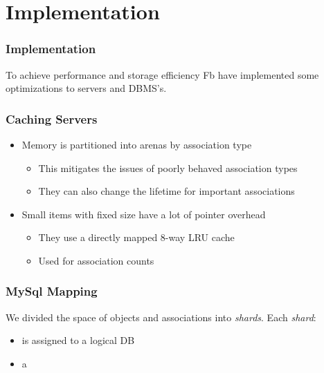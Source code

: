 \section{Implementation}
\begin{frame}
\frametitle{Implementation}
To achieve performance and storage efficiency Fb have implemented some optimizations to servers and DBMS's. 
\end{frame}

\begin{frame}[c]\frametitle{Caching Servers}
\begin{itemize}
	\item Memory is partitioned into arenas by association type
	\begin{itemize}
		\item This mitigates the issues of poorly behaved association types
		\item They can also change the lifetime for important associations
	\end{itemize}
	\item Small items with fixed size have a lot of pointer overhead
	\begin{itemize}
		\item They use a directly mapped 8-way LRU cache
		\item Used for association counts
	\end{itemize}
\end{itemize}    
\end{frame}

\begin{frame}[c]\frametitle{MySql Mapping}
    We divided the space of objects and associations into \emph{shards}. Each \emph{shard}:
    \begin{itemize}
    	\item is assigned to a logical DB
    	\item a
    \end{itemize}


\end{frame}
